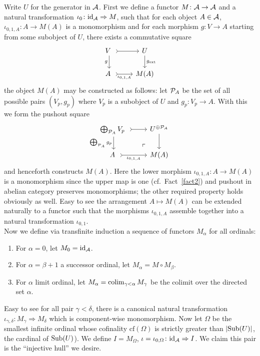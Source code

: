 \documentclass[twoside]{article}
\begin{document}
 Write $U$ for the generator in ${\mathcal{A}}$.
First we define a functor $M\colon {\mathcal{A}} \rightarrow {\mathcal{A}}$ and a natural transformation $\iota_0\colon \mathrm{id}_{\mathcal{A}} \Rightarrow M$, such that for each object $A \in {\mathcal{A}}$, $\iota_{0, 1, A}\colon A \rightarrow M(A)$ is a monomorphism and for each morphism $g\colon V \rightarrow A$ starting from some subobject of $U$, there exists a commutative square
$$\begin{tikzcd}
    V \ \ar[r, tail] \ar[d, "g"']  & U \ar[d, "g_{\mathrm{ext}}"]\\
A \ \ar[r, tail, "\iota_{0, 1, A}"'] &M(A)
\end{tikzcd}$$
the object $M(A)$ may be constructed as follows: let ${\mathcal{P}}_A$ be the set of all possible pairs $(V_p, g_p)$ where $V_p$ is a subobject of $U$ and $g_p\colon V_p \rightarrow A$. With this we form the pushout square
$$\begin{tikzcd}
    \bigoplus_{\EP_A} V_p \ \ar[r, tail] \ar[d, "\bigoplus_{\EP_A} g_p"']  & U^{\oplus \EP_A} \ar[d]\\
A \ \ar[r, tail, "\iota_{0, 1, A}"'] & M(A) \pushout
\end{tikzcd}$$
and henceforth constructs $M(A)$. Here the lower morphism $\iota_{0,1, A}\colon A \rightarrow M(A)$ is a monomorphism since the upper map is one (cf.\ Fact~\ref{fact2}) and pushout in abelian category preserves monomorphisms; the other required property holds obviously as well. Easy to see the arrangement $A \mapsto M(A)$ can be extended naturally to a functor such that the morphisms $\iota_{0,1, A}$ assemble together into a natural transformation $\iota_{0,1}$.\\

Now we define via transfinite induction a sequence of functors $M_\alpha$ for all ordinals:
\begin{enumerate}
\item For $\alpha = 0$, let $M_0 = \mathrm{id}_{\mathcal{A}}$.
\item For $\alpha = \beta + 1$ a successor ordinal, let $M_\alpha = M \circ M_\beta$.
\item For $\alpha$ limit ordinal, let $M_\alpha = \operatorname*{\mathrm{colim}}_{\gamma < \alpha} M_\gamma$ be the colimit over the directed set $\alpha$.
\end{enumerate}
Easy to see for all pair $\gamma < \delta$, there is a canonical natural transformation $\iota_{\gamma, \delta}\colon M_\gamma \Rightarrow M_\delta$ which is component-wise monomorphism. Now let $\Omega$ be the smallest infinite ordinal whose cofinality $\mathrm{cf}(\Omega)$ is strictly greater than $\left|  \mathrm{Sub}(U) \right|$, the cardinal of $\mathrm{Sub}(U)$). We define $I = M_\Omega$, $\iota = \iota_{0, \Omega}\colon \mathrm{id}_{\mathcal{A}} \Rightarrow I$. We claim this pair is the ``injective hull'' we desire.\\
\end{document}
